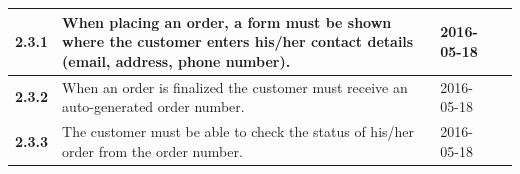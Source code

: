 \documentclass[a4paper,12pt]{article}
\begin{document}
\begin{table}[htbp]
\begin{tabular}{|l|L{8cm}|L{2.5cm}|L{2.5cm}|}
		\textbf{2.3.1} & When placing an order, a form must be shown where the customer enters his/her contact details (email, address, phone number).                      &   2016-05-18       &        \\ \hline
		\textbf{2.3.2} & When an order is finalized the customer must receive an auto-generated order number.                                                                                                          &   2016-05-18        &        \\ \hline
		\textbf{2.3.3} & The customer must be able to check the status of his/her order from the order number.                                                                                                         &   2016-05-18        &        \\ \hline
	\end{tabular}
\end{table}

\newpage
\end{document}

